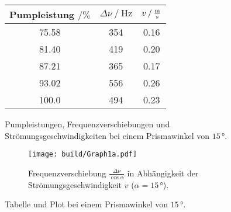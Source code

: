 \begin{figure}
    \begin{subtable}{0.43\textwidth}
        \centering
       \begin{tabular}{c c c}
        \toprule 
        {Pumpleistung $\mathbin{/}\%$} & {$\Delta \nu \mathbin{/} \unit{\hertz}$} & {$v \mathbin{/} \unit{\frac{\meter}{\second}}$}  \\
        \midrule 
            75.58   &   354  & 0.16 \\
            81.40   &   419  & 0.20 \\
            87.21   &   365  & 0.17 \\
            93.02   &   556  & 0.26 \\
            100.0   &   494  & 0.23 \\
        \bottomrule
       \end{tabular}
       \caption{Pumpleistungen, Frequenzverschiebungen und Strömungsgeschwindigkeiten bei einem Prismawinkel von $15 \,°$.}
       \label{tab:1winkel1} 
       \qquad
    \end{subtable}
    \begin{subfigure}{0.57\textwidth} 
        \centering
        \texttt{[image: build/Graph1a.pdf]} %
        \caption{Frequenzverschiebung $\frac{\Delta \nu}{\cos\alpha}$ in Abhängigkeit der Strömungsgeschwindigkeit $v$ ($\alpha = 15 \,°$).} 
        \label{fig:graph1a}
        \qquad
    \end{subfigure}
    \caption{Tabelle und Plot bei einem Prismawinkel von $15 \,°$.} 
\end{figure} 

